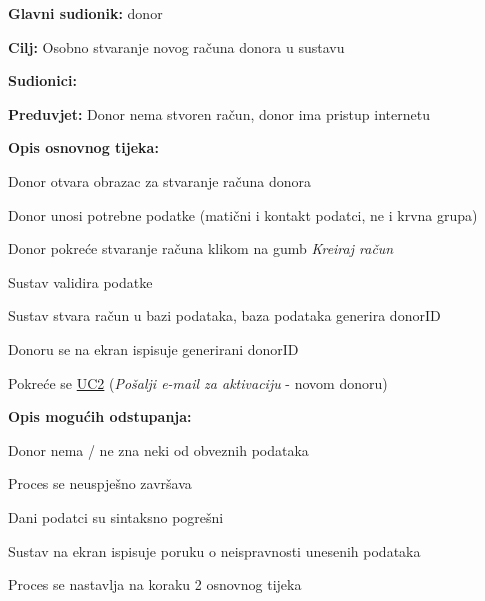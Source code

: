 					\noindent {}
					\begin{packed_item}
	
						\item \textbf{Glavni sudionik: }donor
						\item  \textbf{Cilj:} Osobno stvaranje novog računa donora u sustavu
						\item  \textbf{Sudionici:} 
						\item  \textbf{Preduvjet:} Donor nema stvoren račun, donor ima pristup internetu
						\item  \textbf{Opis osnovnog tijeka:}
						
						\item[] \begin{packed_enum}
                        	\item Donor otvara obrazac za stvaranje računa donora
							\item Donor unosi potrebne podatke (matični i kontakt podatci, ne i krvna grupa)
							\item Donor pokreće stvaranje računa klikom na gumb \textit{Kreiraj račun}
							\item Sustav validira podatke 
							\item Sustav stvara račun u bazi podataka, baza podataka generira donorID
							\item Donoru se na ekran ispisuje generirani donorID
							\item Pokreće se \hyperref[UC2]{UC2} (\textit{Pošalji e-mail za aktivaciju} - novom donoru)
						\end{packed_enum}
						
						\item  \textbf{Opis mogućih odstupanja:}
						
						\item[] \begin{packed_item}
	
                        	\item[2.a] Donor nema / ne zna neki od obveznih podataka
							\begin{packed_enum}
								\item Proces se neuspješno završava
							\end{packed_enum}
						
							\item[4.a] Dani podatci su sintaksno pogrešni
							\begin{packed_enum}
								\item Sustav na ekran ispisuje poruku o neispravnosti unesenih podataka
								\item Proces se nastavlja na koraku 2 osnovnog tijeka
							\end{packed_enum}
							

\end{packed_item}
\end{packed_item}
